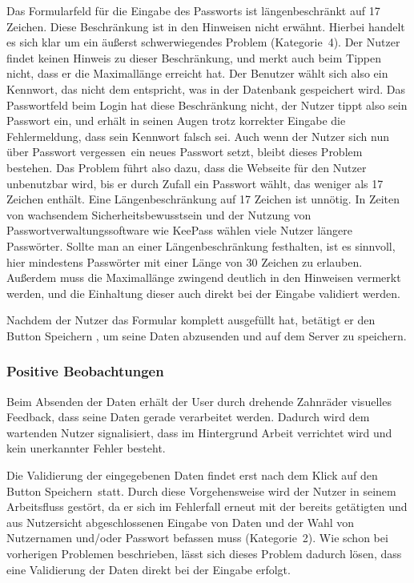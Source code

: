 {
Das Formularfeld für die Eingabe des Passworts ist längenbeschränkt auf 17 Zeichen. Diese Beschränkung ist in den Hinweisen nicht erwähnt.
}
{
Hierbei handelt es sich klar um ein äußerst schwerwiegendes Problem (Kategorie~4). Der Nutzer findet keinen Hinweis zu dieser Beschränkung, und merkt auch beim Tippen nicht, dass er die Maximallänge erreicht hat. Der Benutzer wählt sich also ein Kennwort, das nicht dem entspricht, was in der Datenbank gespeichert wird. Das Passwortfeld beim Login hat diese Beschränkung nicht, der Nutzer tippt also sein Passwort ein, und erhält in seinen Augen trotz korrekter Eingabe die Fehlermeldung, dass sein Kennwort falsch sei. Auch wenn der Nutzer sich nun über \glqq Passwort vergessen\grqq ~ein neues Passwort setzt, bleibt dieses Problem bestehen. Das Problem führt also dazu, dass die Webseite für den Nutzer unbenutzbar wird, bis er durch Zufall ein Passwort wählt, das weniger als 17 Zeichen enthält.
}
{
Eine Längenbeschränkung auf 17 Zeichen ist unnötig. In Zeiten von wachsendem Sicherheitsbewusstsein und der Nutzung von Passwortverwaltungssoftware wie KeePass wählen viele Nutzer längere Passwörter. Sollte man an einer Längenbeschränkung festhalten, ist es sinnvoll, hier mindestens Passwörter mit einer Länge von 30 Zeichen zu erlauben. Außerdem muss die Maximallänge zwingend deutlich in den Hinweisen vermerkt werden, und die Einhaltung dieser auch direkt bei der Eingabe validiert werden.
}
\label{prob:frei:passwortlaenge}

Nachdem der Nutzer das Formular komplett ausgefüllt hat, betätigt er den Button \glqq Speichern \grqq , um seine Daten abzusenden und auf dem Server zu speichern.

\subsubsection*{Positive Beobachtungen}
\label{subsubsec:freischaltung_absenden_positiv}
Beim Absenden der Daten erhält der User durch drehende Zahnräder visuelles Feedback, dass seine Daten gerade verarbeitet werden. Dadurch wird dem wartenden Nutzer signalisiert, dass im Hintergrund Arbeit verrichtet wird und kein unerkannter Fehler besteht.

{
Die Validierung der eingegebenen Daten findet erst nach dem Klick auf den Button \glqq Speichern\grqq ~statt.
}
{
Durch diese Vorgehensweise wird der Nutzer in seinem Arbeitsfluss gestört, da er sich im Fehlerfall erneut mit der bereits getätigten und aus Nutzersicht abgeschlossenen Eingabe von Daten und der Wahl von Nutzernamen und/oder Passwort befassen muss (Kategorie~2).
}
{
Wie schon bei vorherigen Problemen beschrieben, lässt sich dieses Problem dadurch lösen, dass eine Validierung der Daten direkt bei der Eingabe erfolgt.
}
\label{prob:frei:validierung}

